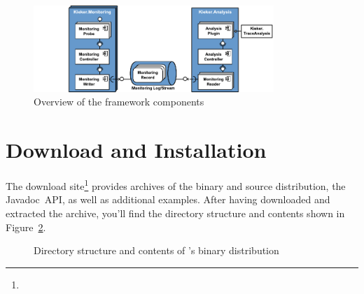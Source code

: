 		\begin{figure}[H]\centering
			\includegraphics[width=0.81\textwidth]{images/kiekerComponentDiagram-woCloud-bw-w-record-newNames-withTraceAnalysis-colors}
			
			\caption{Overview of the framework components}
			\label{fig:KiekerComponentDiagram}
		\end{figure}
	
	\section{Download and Installation}
		
		The \Kieker{} download site\footnote{\KiekerDownloadURL{}} provides archives of the binary and source distribution, the Javadoc~API, as well as additional examples. After having downloaded and extracted the archive, you'll find the directory structure and contents shown in Figure~\ref{fig:binary-layout}.

		\begin{figure}[h!]%
		\begin{graybox}
		\end{graybox}
		\caption{Directory structure and contents of \Kieker{}'s binary distribution}
		\label{fig:binary-layout}
		\end{figure}

